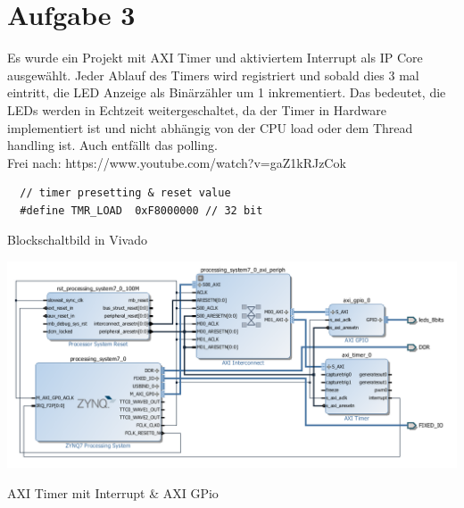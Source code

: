 \section{Aufgabe 3} \label{ex3}

Es wurde ein Projekt mit AXI Timer und aktiviertem Interrupt als IP Core ausgewählt. Jeder Ablauf des Timers wird 
registriert und sobald dies 3 mal eintritt, die LED Anzeige als Binärzähler um 1 inkrementiert. 
Das bedeutet, die LEDs werden in Echtzeit weitergeschaltet, da der Timer in Hardware implementiert ist und nicht abhängig 
von der CPU load oder dem Thread handling ist. Auch entfällt das polling.\\

Frei nach: https://www.youtube.com/watch?v=gaZ1kRJzCok

\begin{verbatim}
  // timer presetting & reset value
  #define TMR_LOAD  0xF8000000 // 32 bit
\end{verbatim}

Blockschaltbild in Vivado\\
\begin{minipage}{\textwidth}
    \begin{center}        
        \includegraphics[scale=0.57]{img/timer3block.png} 
    \end{center}
\end{minipage}
\begin{center}
AXI Timer mit Interrupt \& AXI GPio
\end{center}


